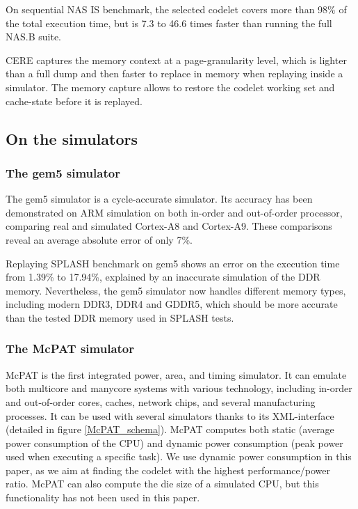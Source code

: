 \documentclass{article}
\begin{document}
\begin{multicols}{2}
On sequential NAS IS benchmark, the selected codelet covers more than 98\% of the total execution time, but is 7.3 to 46.6 times faster than running the full NAS.B suite.



CERE captures the memory context at a page-granularity level, which is lighter than a full dump and then faster to replace in memory when replaying inside a simulator. The memory capture allows to restore the codelet working set and cache-state before it is replayed. 





\subsection{On the simulators}
\subsubsection*{The gem5 simulator}
The gem5 simulator is a cycle-accurate simulator. Its accuracy has been demonstrated on ARM simulation on both in-order and out-of-order processor, comparing real and simulated Cortex-A8 and Cortex-A9\cite{DBLP:conf/samos/EndoCC14}. These comparisons reveal an average absolute error of only 7\%.

Replaying SPLASH benchmark on gem5 shows an error on the execution time from 1.39\% to 17.94\%, explained by an inaccurate simulation of the DDR memory. Nevertheless, the gem5 simulator now handles different memory types, including modern DDR3, DDR4 and GDDR5, which should be more accurate than the tested DDR memory used in SPLASH tests\cite{DBLP:conf/recosoc/ButkoGOS12}.


\subsubsection*{The McPAT simulator}
McPAT is the first integrated power, area, and timing simulator. It can emulate both multicore and manycore systems with various technology, including in-order and out-of-order cores, caches, network chips, and several manufacturing processes. It can be used with several simulators thanks to its XML-interface (detailed in figure \ref{McPAT_schema}). McPAT computes both static (average power consumption of the CPU) and dynamic power consumption (peak power used when executing a specific task). We use dynamic power consumption in this paper, as we aim at finding the codelet with the highest performance/power ratio.
McPAT can also compute the die size of a simulated CPU, but this functionality has not been used in this paper.



\end{multicols}
\end{document}
